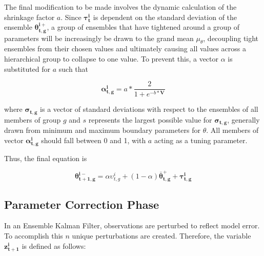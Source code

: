 The final modification to be made involves the dynamic calculation of the shrinkage factor $a$. Since $\mathbf{\tau_{t}^{i}}$ is dependent on the standard deviation of the ensemble $\mathbf{\theta_{t,g}^{i+}}$, a group of ensembles that have tightened around a group of parameters will be increasingly be drawn to the grand mean $\mu_{\theta}$, decoupling tight ensembles from their chosen values and ultimately causing all values across a hierarchical group to collapse to one value. To prevent this, a vector $\alpha$ is substituted for $a$ such that



\begin{equation}\label{eq:hdekf_new_alpha}
\mathbf{\alpha_{t,g}^{i}} = a * \frac{2}{1+e^{-b*\mathbf{V}}}
\end{equation}

where $\mathbf{\sigma_{t,g}}$ is a vector of standard deviations with respect to the ensembles of all members of group $g$ and $s$ represents the largest possible value for $\mathbf{\sigma_{t,g}}$, generally drawn from minimum and maximum boundary parameters for $\theta$. All members of vector $\mathbf{\alpha_{t,g}^{i}}$ should fall between 0 and 1, with $a$ acting as a tuning parameter.

Thus, the final equation is

\begin{equation}\label{eq:hdekf_theta_final}
\mathbf{\theta_{t+1,g}^{i-}} = \alpha \upsilon_{t,g}^{i} + (1-\alpha)\mathbf{\bar{\theta}_{t,g}^{+}} + \mathbf{\tau_{t,g}^{i}}
\end{equation}

\subsection{Parameter Correction Phase}

In an Ensemble Kalman Filter, observations are perturbed to reflect model error. To accomplish this $n$ unique perturbations are created. Therefore, the variable $\mathbf{z_{t+1}^{i}}$ is defined as follows:

